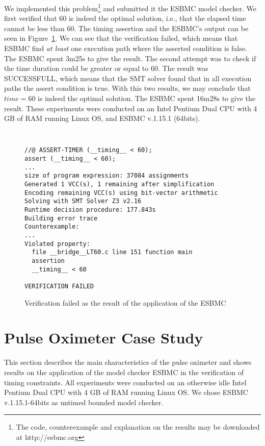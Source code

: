 \documentclass{llncs}
\begin{document}
We implemented this problem\footnote{The code, counterexample and explanation on the results may be downloaded at 
http://esbmc.org} and submitted it the ESBMC model checker. 
We first verified that 60 is indeed the optimal solution, i.e., that
the elapsed time cannot be less than 60. 
The timing assertion and the ESBMC's output can be seen in Figure~\ref{code:toy_result_less}.
We can see that the verification failed, which means that ESBMC find 
\emph{at least} one execution path where the asserted condition is false.
The ESBMC spent 3m25s to give the result.
The second attempt was to check if the time duration could be greater or equal to 60.
The result was SUCCESSFULL, which means that the SMT solver found that in all execution paths 
the assert condition is true.
With this two results, we may conclude that $time=60$  is indeed the optimal solution.
The ESBMC spent 16m28s to give the result.
These experiments were conducted on an Intel Pentium Dual CPU with 4 GB of RAM running Linux
OS, and ESBMC v.1.15.1 (64bits).


\begin{figure}[!htb]
{\scriptsize
{\tt
\begin{minipage}{\textwidth}
\begin{verbatim}
//@ ASSERT-TIMER (__timing__ < 60);
assert (__timing__ < 60);
...
size of program expression: 37084 assignments
Generated 1 VCC(s), 1 remaining after simplification
Encoding remaining VCC(s) using bit-vector arithmetic
Solving with SMT Solver Z3 v2.16
Runtime decision procedure: 177.843s
Building error trace
Counterexample:
...
Violated property:
  file __bridge__LT60.c line 151 function main
  assertion
  __timing__ < 60

VERIFICATION FAILED
\end{verbatim}
\end{minipage}
}
}
\caption{Verification failed as the result of the application of the ESBMC}
\label{code:toy_result_less}
\end{figure}



\section{Pulse Oximeter Case Study}

This section describes the main characteristics of the pulse oximeter and shows results on the application of the
model checker ESBMC in the verification of timing constraints.
All experiments were conducted on an otherwise idle Intel Pentium Dual CPU with 4 GB of RAM running Linux
OS. We chose ESBMC v.1.15.1-64bits as untimed bounded model checker.
\end{document}
